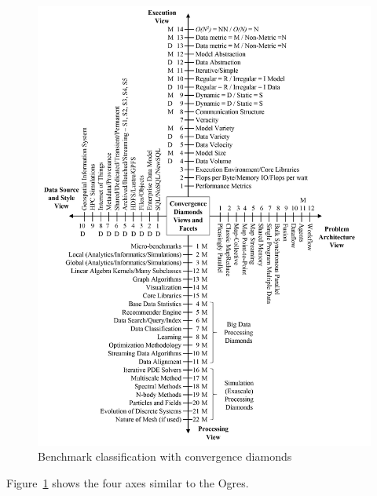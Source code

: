 \begin{figure}[!h]
\centering
\includegraphics[width=1\columnwidth]{figures/fig_ogres}
\caption{Benchmark classification with convergence diamonds}
\label{fig:fig_ogres}
\end{figure}

Figure~\ref{fig:fig_ogres} shows the four axes similar to the Ogres. 
